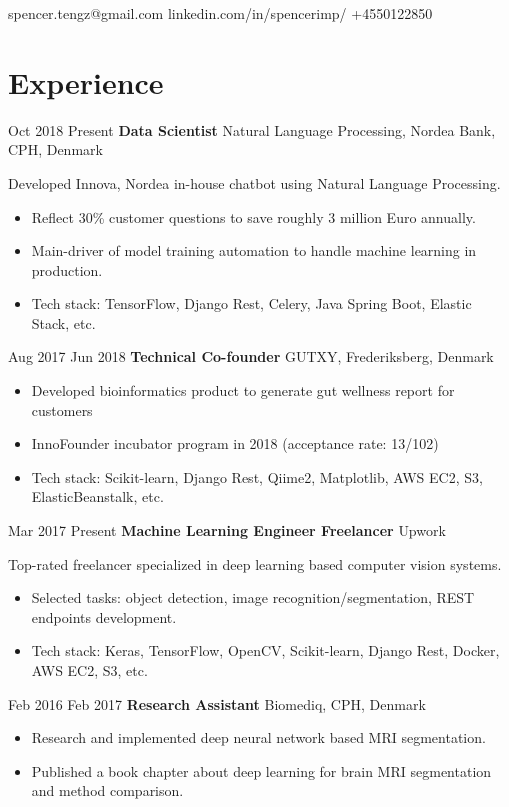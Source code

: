 \documentclass[11pt]{article} %
\begin{document}
{\begin{minipage}[t]{0.2\textwidth}
spencer.tengz@gmail.com
linkedin.com/in/spencerimp/
+4550122850
\end{minipage}

\section{Experience}
\job
{Oct 2018 }{Present}
{\textbf{Data Scientist}}
{}
{Natural Language Processing, Nordea Bank, CPH, Denmark}
{
	Developed Innova, Nordea in-house chatbot using Natural Language Processing.
    \begin{itemize}
    	\itemsep-0.2em
    	\item Reflect 30\% customer questions to save roughly 3 million Euro annually.
    	\item Main-driver of model training automation to handle machine learning in production.
    	\item Tech stack: TensorFlow, Django Rest, Celery, Java Spring Boot, Elastic Stack, etc.
    \end{itemize}
}
\job
{Aug 2017 }{Jun 2018}
{\textbf{Technical Co-founder}}
{}
{GUTXY, Frederiksberg, Denmark}
{
 	\begin{itemize}
		\itemsep-0.2em
		\item Developed bioinformatics product to generate gut wellness report for customers  
		\item InnoFounder incubator program in 2018 (acceptance rate: 13/102)
		\item Tech stack: Scikit-learn, Django Rest, Qiime2, Matplotlib, AWS EC2, S3, ElasticBeanstalk, etc.
	\end{itemize}

}
\job
{Mar 2017 }{Present}
{\textbf{Machine Learning Engineer Freelancer}}
{}
{Upwork}
{
	Top-rated freelancer specialized in deep learning based computer vision systems.
 	\begin{itemize}
		\itemsep-0.2em
		\item Selected tasks: object detection, image recognition/segmentation, REST endpoints development.
		\item Tech stack: Keras, TensorFlow, OpenCV, Scikit-learn, Django Rest, Docker, AWS EC2, S3, etc.
	\end{itemize}
}
\job
{Feb 2016 }{Feb 2017}
{\textbf{Research Assistant}}
{}
{Biomediq, CPH, Denmark}
{
 	\begin{itemize}
		\itemsep-0.2em
		\item Research and implemented deep neural network based MRI segmentation.
		\item Published a book chapter about deep learning for brain MRI segmentation and method comparison.
	\end{itemize}

}}
\end{document}

